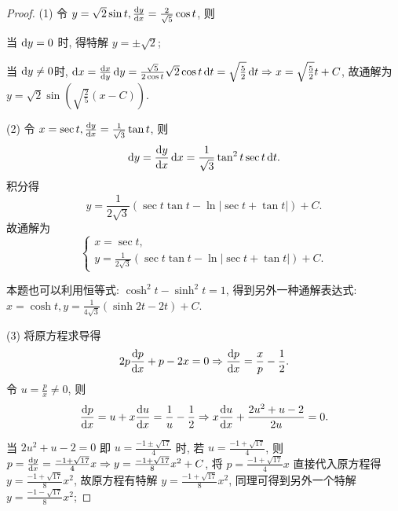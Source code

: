 \begin{proof} 
  (1) 令 $y=\sqrt{2}\sin t,\frac{\mathop{}\!\mathrm{d} y}{\mathop{}\!\mathrm{d} x}=\frac{2}{\sqrt{5}}\cos t$, 则

  当 $\mathop{}\!\mathrm{d} y=0$ 时, 得特解 $y=\pm\sqrt{2}$;

  当 $\mathop{}\!\mathrm{d} y\neq 0$时, $\mathop{}\!\mathrm{d} x=\frac{\mathop{}\!\mathrm{d} x}{\mathop{}\!\mathrm{d} y}\mathop{}\!\mathrm{d} y=\frac{\sqrt{5}}{2\cos t}\sqrt{2}\cos t\mathop{}\!\mathrm{d} t=\sqrt{\frac{5}{2}}\mathop{}\!\mathrm{d} t\Rightarrow x=\sqrt{\frac{5}{2}}t+C$, 
  故通解为 $y=\sqrt{2}\sin\left(\sqrt{\frac{2}{5}}(x-C)\right)$.

  (2) 令 $x=\sec t,\frac{\mathop{}\!\mathrm{d} y}{\mathop{}\!\mathrm{d} x}=\frac{1}{\sqrt{3}}\tan t$, 则
  \[\mathop{}\!\mathrm{d} y=\frac{\mathop{}\!\mathrm{d} y}{\mathop{}\!\mathrm{d} x}\mathop{}\!\mathrm{d} x=\frac{1}{\sqrt{3}}\tan^2t\sec t\mathop{}\!\mathrm{d} t.\]
  积分得
  \[y=\frac{1}{2\sqrt{3}}(\sec t\tan t-\ln|\sec t+\tan t|)+C.\]
  故通解为
  \[\begin{cases}
    x = \sec t, \\
    y = \frac{1}{2\sqrt{3}}(\sec t\tan t-\ln|\sec t+\tan t|)+C.
  \end{cases}\]
  
  本题也可以利用恒等式: $\cosh^2t-\sinh^2t=1$, 
  得到另外一种通解表达式: $x=\cosh t,y=\frac{1}{4\sqrt{3}}(\sinh2t-2t)+C$.

  (3) 将原方程求导得
  \[2p\frac{\mathop{}\!\mathrm{d} p}{\mathop{}\!\mathrm{d} x}+p-2x=0\Rightarrow \frac{\mathop{}\!\mathrm{d} p}{\mathop{}\!\mathrm{d} x}=\frac{x}{p}-\frac{1}{2}.\] 
  令 $u=\frac{p}{x}\neq 0$, 则
  \[\frac{\mathop{}\!\mathrm{d} p}{\mathop{}\!\mathrm{d} x}=u+x\frac{\mathop{}\!\mathrm{d} u}{\mathop{}\!\mathrm{d} x}=\frac{1}{u}-\frac{1}{2}\Rightarrow x\frac{\mathop{}\!\mathrm{d} u}{\mathop{}\!\mathrm{d} x}+\frac{2u^2+u-2}{2u}=0.\]

  \textbullet 当 $2u^2+u-2=0$ 即 $u=\frac{-1\pm\sqrt{17}}{4}$ 时,
  若 $u=\frac{-1+\sqrt{17}}{4}$, 
  则 $p=\frac{\mathop{}\!\mathrm{d} y}{\mathop{}\!\mathrm{d} x}=\frac{-1+\sqrt{17}}{4}x\Rightarrow y=\frac{-1+\sqrt{17}}{8}x^2+C$, 
  将 $p=\frac{-1+\sqrt{17}}{4}x$ 直接代入原方程得 $y=\frac{-1+\sqrt{17}}{8}x^2$, 
  故原方程有特解 $y=\frac{-1+\sqrt{17}}{8}x^2$, 同理可得到另外一个特解 $y=\frac{-1-\sqrt{17}}{8}x^2$;


\end{proof}
